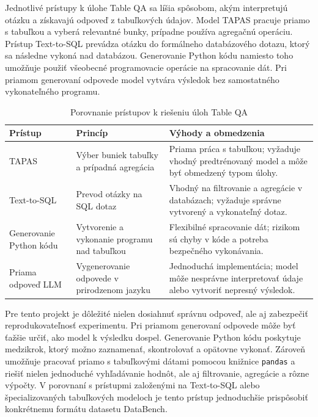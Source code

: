 Jednotlivé prístupy k úlohe Table QA sa líšia spôsobom, akým interpretujú otázku a získavajú odpoveď z tabuľkových údajov. Model TAPAS pracuje priamo s tabuľkou a vyberá relevantné bunky, prípadne používa agregačnú operáciu. Prístup Text-to-SQL prevádza otázku do formálneho databázového dotazu, ktorý sa následne vykoná nad databázou. Generovanie Python kódu namiesto toho umožňuje použiť všeobecné programovacie operácie na spracovanie dát. Pri priamom generovaní odpovede model vytvára výsledok bez samostatného vykonateľného programu.

\begin{table}[htbp]
    \centering
    \caption{Porovnanie prístupov k riešeniu úloh Table QA}
    \label{tab:approaches-comparison}
    \small
    \renewcommand{\arraystretch}{1.2}
    \begin{tabularx}{\textwidth}{
        >{\raggedright\arraybackslash}p{3cm}
        >{\raggedright\arraybackslash}X
        >{\raggedright\arraybackslash}X}
        \toprule
        \textbf{Prístup} &
        \textbf{Princíp} &
        \textbf{Výhody a obmedzenia} \\
        \midrule
        TAPAS &
        Výber buniek tabuľky a prípadná agregácia &
        Priama práca s tabuľkou; vyžaduje vhodný predtrénovaný
        model a môže byť obmedzený typom úlohy. \\

        Text-to-SQL &
        Prevod otázky na SQL dotaz &
        Vhodný na filtrovanie a agregácie v databázach;
        vyžaduje správne vytvorený a vykonateľný dotaz. \\

        Generovanie Python kódu &
        Vytvorenie a vykonanie programu nad tabuľkou &
        Flexibilné spracovanie dát; rizikom sú chyby
        v kóde a potreba bezpečného vykonávania. \\

        Priama odpoveď LLM &
        Vygenerovanie odpovede v prirodzenom jazyku &
        Jednoduchá implementácia; model môže nesprávne
        interpretovať údaje alebo vytvoriť nepresný výsledok. \\
        \bottomrule
    \end{tabularx}
\end{table}

Pre tento projekt je dôležité nielen dosiahnuť správnu odpoveď, ale aj zabezpečiť reprodukovateľnosť experimentu. Pri priamom generovaní odpovede môže byť ťažšie určiť, ako model k výsledku dospel. Generovanie Python kódu poskytuje medzikrok, ktorý možno zaznamenať, skontrolovať a opätovne vykonať. Zároveň umožňuje pracovať priamo s tabuľkovými dátami pomocou knižnice \texttt{pandas} a riešiť nielen jednoduché vyhľadávanie hodnôt, ale aj filtrovanie, agregácie a rôzne výpočty. V porovnaní s prístupmi založenými na Text-to-SQL alebo špecializovaných tabuľkových modeloch je tento prístup jednoduchšie prispôsobiť konkrétnemu formátu datasetu DataBench.

